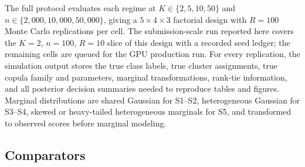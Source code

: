 The full protocol evaluates each regime at $K \in \{2,5,10,50\}$ and $n \in \{2{,}000,10{,}000,50{,}000\}$, giving a $5\times4\times3$ factorial design with $R=100$ Monte Carlo replications per cell. The submission-scale run reported here covers the $K=2$, $n=100$, $R=10$ slice of this design with a recorded seed ledger; the remaining cells are queued for the GPU production run. For every replication, the simulation output stores the true class labels, true cluster assignments, true copula family and parameters, marginal transformations, rank-tie information, and all posterior decision summaries needed to reproduce tables and figures. Marginal distributions are shared Gaussian for S1--S2, heterogeneous Gaussian for S3--S4, skewed or heavy-tailed heterogeneous marginals for S5, and transformed to observed scores before marginal modeling.

\subsection{Comparators}
\label{sec:sim-comparators}

